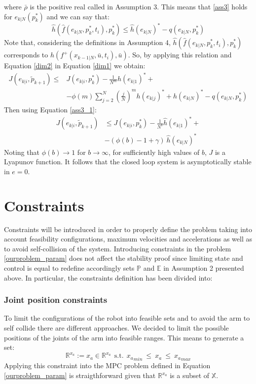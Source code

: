 where $\bar{\rho}$ is the positive real called in Assumption 3. This means that \ref{ass3} holds for $e_{k|N}(p_k^*)$ and we can say that:
\begin{equation}\label{dim2}
    \hat{h}(\hat{f}(e_{k|N},p_k^*,t_i),p_k^*) \le \hat{h}(e_{k|N})^*-q(e_{k|N},p_k^*)
\end{equation}
Note that, considering the definitions in Assumption 4, $\hat{h}(\hat{f}(e_{k|N},p_k^*,t_i),p_k^*)$ corresponds to $\hat{h}\left(f^+(x_{k-1|N},\bar{u},t_i),\bar{u}\right)$. So, by applying this relation and Equation \ref{dim2} in Equation \ref{dim1} we obtain: 
\begin{equation*}
    \begin{split}
        J({e}_{k|i},\tilde{p}_{k+1})\le &J({e}_{k|i},p_{k}^*) - \frac{1}{N^m}h(e_{k|1})^*+ \\ 
        &-\phi(m)\sum_{j=2}^{N}\left(\frac{j}{N}\right)^m h(e_{k|j})^*+ h(e_{k|N})^*-q(e_{k|N},p_k^*)
    \end{split}
\end{equation*}
Then using Equation \ref{ass3_1}:
\begin{equation*}
    \begin{split}
        J({e}_{k|i},\tilde{p}_{k+1})&\le J({e}_{k|i},p_{k}^*) - \frac{1}{N^b}\hat{h}(e_{k|1})^*+ \\ 
            &-(\phi(b)-1+\gamma)\ \hat{h}(e_{k|N})^*
    \end{split}
\end{equation*}
Noting that $\phi(b) \rightarrow 1$ for $b \rightarrow \infty$, for sufficiently high values of $b$, $J$ is a Lyapunov function. It follows that the closed loop system is asymptotically stable in $e=0$.

\section{Constraints}

Constraints will be introduced in order to properly define the problem taking into account feasibility configurations, maximum velocities and accelerations as well as to avoid self-collision of the system. Introducing constraints in the problem \ref{ourproblem_param} does not affect the stability proof since limiting state and control is equal to redefine accordingly sets $\mathbb{P}$ and $\mathbb{E}$ in Assumption 2 presented above.
In particular, the constraints definition has been divided into: 

\subsubsection*{Joint position constraints}
	To limit the configurations of the robot into feasible sets and to avoid the arm to self collide there are different approaches. We decided to limit the possible positions of the joints of the arm into feasible ranges. This means to generate a set:
	\begin{equation}
		\mathbb{R}^{x_a}:=x_a \in \mathbb{R}^{x_a}\ \ \text{s.t.}\ \  {x_a}_{min}\ \leq\ x_a\ \leq\ {x_a}_{max} 
	\end{equation}
	Applying this constraint into the MPC problem defined in Equation \ref{ourproblem_param} is straigthforward given that $\mathbb{R}^{x_a}$ is a subset of $\mathbb{X}$.
